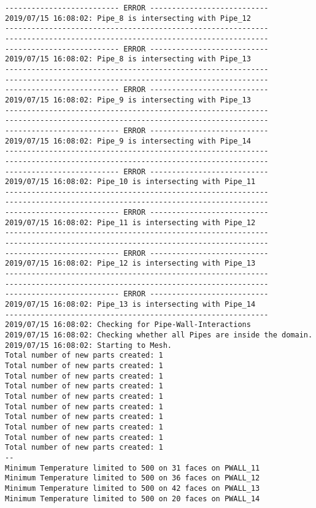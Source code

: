 \documentclass{article}
\begin{document}
{\begin{verbatim}
-------------------------- ERROR ---------------------------
2019/07/15 16:08:02: Pipe_8 is intersecting with Pipe_12
------------------------------------------------------------
------------------------------------------------------------
-------------------------- ERROR ---------------------------
2019/07/15 16:08:02: Pipe_8 is intersecting with Pipe_13
------------------------------------------------------------
------------------------------------------------------------
-------------------------- ERROR ---------------------------
2019/07/15 16:08:02: Pipe_9 is intersecting with Pipe_13
------------------------------------------------------------
------------------------------------------------------------
-------------------------- ERROR ---------------------------
2019/07/15 16:08:02: Pipe_9 is intersecting with Pipe_14
------------------------------------------------------------
------------------------------------------------------------
-------------------------- ERROR ---------------------------
2019/07/15 16:08:02: Pipe_10 is intersecting with Pipe_11
------------------------------------------------------------
------------------------------------------------------------
-------------------------- ERROR ---------------------------
2019/07/15 16:08:02: Pipe_11 is intersecting with Pipe_12
------------------------------------------------------------
------------------------------------------------------------
-------------------------- ERROR ---------------------------
2019/07/15 16:08:02: Pipe_12 is intersecting with Pipe_13
------------------------------------------------------------
------------------------------------------------------------
-------------------------- ERROR ---------------------------
2019/07/15 16:08:02: Pipe_13 is intersecting with Pipe_14
------------------------------------------------------------
2019/07/15 16:08:02: Checking for Pipe-Wall-Interactions
2019/07/15 16:08:02: Checking whether all Pipes are inside the domain.
2019/07/15 16:08:02: Starting to Mesh.
Total number of new parts created: 1
Total number of new parts created: 1
Total number of new parts created: 1
Total number of new parts created: 1
Total number of new parts created: 1
Total number of new parts created: 1
Total number of new parts created: 1
Total number of new parts created: 1
Total number of new parts created: 1
Total number of new parts created: 1
--
Minimum Temperature limited to 500 on 31 faces on PWALL_11
Minimum Temperature limited to 500 on 36 faces on PWALL_12
Minimum Temperature limited to 500 on 42 faces on PWALL_13
Minimum Temperature limited to 500 on 20 faces on PWALL_14

\end{verbatim}}
\end{document}
